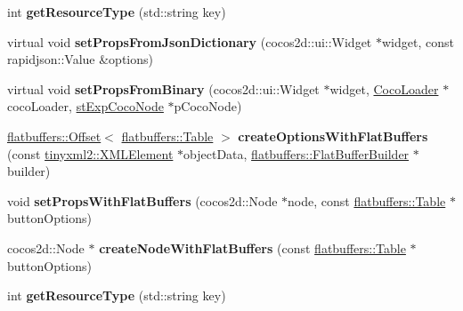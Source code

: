 \begin{DoxyCompactItemize}
int {\bfseries get\+Resource\+Type} (std\+::string key)
\item 
\mbox{\label{classcocostudio_1_1ButtonReader_a47c7500f22412e3e3a24e62c5c96110b}} 
virtual void {\bfseries set\+Props\+From\+Json\+Dictionary} (cocos2d\+::ui\+::\+Widget $\ast$widget, const rapidjson\+::\+Value \&options)
\item 
\mbox{\label{classcocostudio_1_1ButtonReader_a77c328af9dbe4ee601bc733b6c8fd9b0}} 
virtual void {\bfseries set\+Props\+From\+Binary} (cocos2d\+::ui\+::\+Widget $\ast$widget, \hyperlink{classcocostudio_1_1CocoLoader}{Coco\+Loader} $\ast$coco\+Loader, \hyperlink{structcocostudio_1_1stExpCocoNode}{st\+Exp\+Coco\+Node} $\ast$p\+Coco\+Node)
\item 
\mbox{\label{classcocostudio_1_1ButtonReader_af0824a834db6ade54c4b44a46e9de46a}} 
\hyperlink{structflatbuffers_1_1Offset}{flatbuffers\+::\+Offset}$<$ \hyperlink{classflatbuffers_1_1Table}{flatbuffers\+::\+Table} $>$ {\bfseries create\+Options\+With\+Flat\+Buffers} (const \hyperlink{classtinyxml2_1_1XMLElement}{tinyxml2\+::\+X\+M\+L\+Element} $\ast$object\+Data, \hyperlink{classflatbuffers_1_1FlatBufferBuilder}{flatbuffers\+::\+Flat\+Buffer\+Builder} $\ast$builder)
\item 
\mbox{\label{classcocostudio_1_1ButtonReader_adde28f348dc906067cf72cb4537ccedc}} 
void {\bfseries set\+Props\+With\+Flat\+Buffers} (cocos2d\+::\+Node $\ast$node, const \hyperlink{classflatbuffers_1_1Table}{flatbuffers\+::\+Table} $\ast$button\+Options)
\item 
\mbox{\label{classcocostudio_1_1ButtonReader_a0bc52b90c312b3b7839c41d5e49c1e2f}} 
cocos2d\+::\+Node $\ast$ {\bfseries create\+Node\+With\+Flat\+Buffers} (const \hyperlink{classflatbuffers_1_1Table}{flatbuffers\+::\+Table} $\ast$button\+Options)
\item 
\mbox{\label{classcocostudio_1_1ButtonReader_a02a19e88efbba783745757dc306404aa}} 
int {\bfseries get\+Resource\+Type} (std\+::string key)
\end{DoxyCompactItemize}
